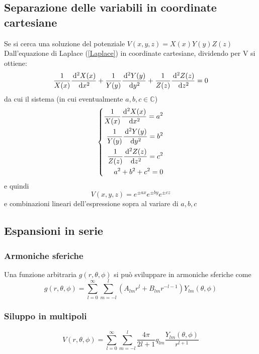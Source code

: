 \documentclass[../main.tex]{subfiles}
\begin{document}
\subsection{Separazione delle variabili in coordinate cartesiane}\label{Separazione}
Se si cerca una soluzione del potenziale $V(x, y, z)=X(x)Y(y)Z(z)$
Dall'equazione di Laplace (\cref{Laplace}) in coordinate cartesiane, dividendo per V si ottiene:
\begin{equation}
  \frac{1}{X(x)}\frac{\,\mathrm d^2X(x)}{\,\mathrm d x^2}+\frac{1}{Y(y)}\frac{\,\mathrm d^2Y(y)}{\,\mathrm d y^2}+\frac{1}{Z(z)}\frac{\,\mathrm d^2Z(z)}{\,\mathrm d z^2}=0
\end{equation}
da cui il sistema (in cui eventualmente $a, b, c \in \mathbb{C}$)
\begin{equation}
  \left\{
    \begin{aligned}
      \frac{1}{X(x)}\frac{\,\mathrm d^2X(x)}{\,\mathrm d x^2}=a^2\\
      \frac{1}{Y(y)}\frac{\,\mathrm d^2Y(y)}{\,\mathrm d y^2}=b^2\\
      \frac{1}{Z(z)}\frac{\,\mathrm d^2Z(z)}{\,\mathrm d z^2}=c^2\\
      a^2+b^2+c^2=0
    \end{aligned}
  \right.
\end{equation}
e quindi
\begin{equation}
  V(x, y, z)=e^{\pm ax}e^{\pm by}e^{\pm cz}
\end{equation}
e combinazioni lineari dell'espressione sopra al variare di $a, b, c$



\subsection{Espansioni in serie}
\subsubsection{Armoniche sferiche}
Una funzione arbitraria $g(r, \theta, \phi)$ si può sviluppare in armoniche sferiche come
\begin{equation}
  \label{Armoniche}
  g(r, \theta, \phi)= \sum_{l=0}^\infty \sum_{m=-l}^l (A_{lm}r^l+B_{lm}r^{-l-1}) Y_{lm}(\theta,\phi)
\end{equation}
\subsubsection{Siluppo in multipoli}
\begin{equation}
  \label{Multipoli}
  V(r, \theta, \phi)=\sum_{l=0}^\infty \sum_{m=-l}^l \frac{4 \pi}{2l+1}q_{lm} \frac{Y_{lm}(\theta, \phi)}{r^{l+1}}
\end{equation}
\end{document}
